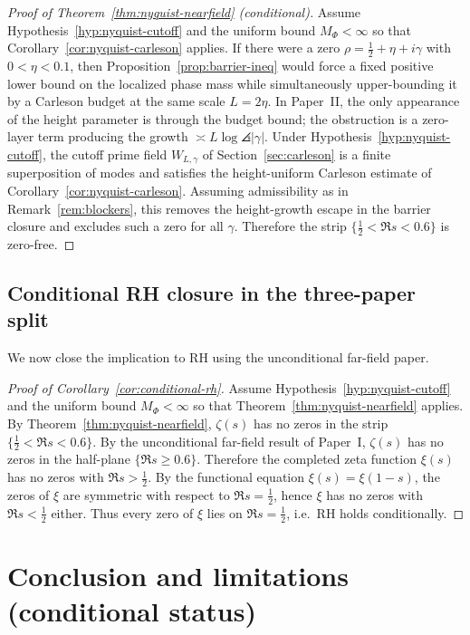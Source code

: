 \documentclass[11pt]{article}
\begin{document}
\begin{proof}[Proof of Theorem~\ref{thm:nyquist-nearfield} (conditional)]
Assume Hypothesis~\ref{hyp:nyquist-cutoff} and the uniform bound $M_\Phi<\infty$ so that Corollary~\ref{cor:nyquist-carleson} applies.
If there were a zero $\rho=\tfrac12+\eta+i\gamma$ with $0<\eta<0.1$, then Proposition~\ref{prop:barrier-ineq} would force a fixed positive lower bound on the localized phase mass while simultaneously upper-bounding it by a Carleson budget at the same scale $L=2\eta$.
In Paper~II, the only appearance of the height parameter is through the budget bound; the obstruction is a zero-layer term producing the growth $\asymp L\log\angles{|\gamma|}$.
Under Hypothesis~\ref{hyp:nyquist-cutoff}, the cutoff prime field $W_{L,\gamma}$ of Section~\ref{sec:carleson} is a finite superposition of modes and satisfies the height-uniform Carleson estimate of Corollary~\ref{cor:nyquist-carleson}.
Assuming admissibility as in Remark~\ref{rem:blockers}, this removes the height-growth escape in the barrier closure and excludes such a zero for all $\gamma$.
Therefore the strip $\{\tfrac12<\Re s<0.6\}$ is zero-free.
\end{proof}

\subsection*{Conditional RH closure in the three-paper split}
We now close the implication to RH using the unconditional far-field paper.

\begin{proof}[Proof of Corollary~\ref{cor:conditional-rh}]
Assume Hypothesis~\ref{hyp:nyquist-cutoff} and the uniform bound $M_\Phi<\infty$ so that Theorem~\ref{thm:nyquist-nearfield} applies.
By Theorem~\ref{thm:nyquist-nearfield}, $\zeta(s)$ has no zeros in the strip $\{\tfrac12<\Re s<0.6\}$.
By the unconditional far-field result of Paper~I, $\zeta(s)$ has no zeros in the half-plane $\{\Re s\ge 0.6\}$.
Therefore the completed zeta function $\xi(s)$ has no zeros with $\Re s>\tfrac12$.
By the functional equation $\xi(s)=\xi(1-s)$, the zeros of $\xi$ are symmetric with respect to $\Re s=\tfrac12$, hence $\xi$ has no zeros with $\Re s<\tfrac12$ either.
Thus every zero of $\xi$ lies on $\Re s=\tfrac12$, i.e.\ RH holds conditionally.
\end{proof}

\section*{Conclusion and limitations (conditional status)}
\end{document}
